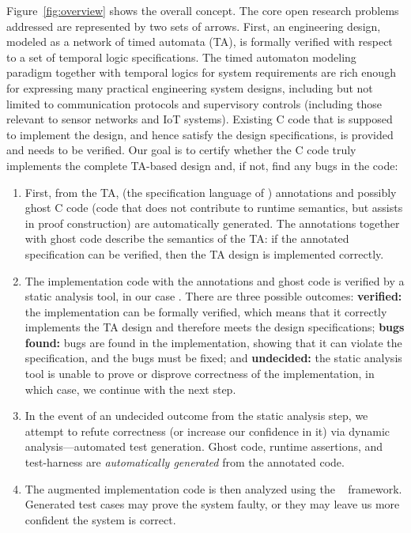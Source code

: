 Figure~\ref{fig:overview} shows the overall concept.  The core
open research problems addressed are represented by two sets of
arrows.  First, an engineering design, modeled as a network of timed
automata (TA), is formally verified with respect to a set of temporal logic specifications.
The timed automaton modeling paradigm together with temporal logics
for system requirements are rich enough for expressing many practical
engineering system designs, including but not limited to communication
protocols and supervisory controls (including those relevant to sensor
networks and IoT systems).  Existing C code that is supposed to
implement the design, and hence satisfy the design specifications, is provided and needs to be verified.
Our goal is to certify whether the C code truly implements the complete TA-based design and, if not, find any bugs in the code:
\begin{enumerate}[labelsep=3pt,leftmargin=12pt]
\item First, from the TA, \acsl (the specification language of
  \framac) annotations and possibly ghost C code
  (code that does not contribute to runtime semantics, but assists in
  proof construction) are automatically generated. The annotations together with ghost code
  describe the semantics of the TA: if
  the annotated specification can be verified, then the TA design is implemented correctly.
\item The implementation code with the \acsl annotations and ghost code
  is verified by a static analysis tool, in our case \framac.
  There are three possible outcomes:
  {\bf verified:} the implementation can be formally verified, which means that it correctly implements the TA design and therefore meets the design specifications;
  {\bf bugs found:} bugs are found in the implementation, showing that
    it can violate the specification, and the bugs must be fixed; and
  {\bf undecided:} the static analysis tool is unable to prove or disprove correctness of the implementation,
  in which case, we continue with the next step.
\item In the event of an undecided outcome from the static analysis
  step, we attempt to refute correctness (or increase our confidence
  in it) via dynamic analysis---automated test generation.
  Ghost code, runtime assertions, and test-harness are \emph{automatically generated} from the
  annotated code.
\item The augmented implementation code is then analyzed using the
  \deepstate~\cite{DeepState} framework.  Generated test cases may
  prove the system faulty, or they may leave us more confident
  the system is correct.
\end{enumerate}

